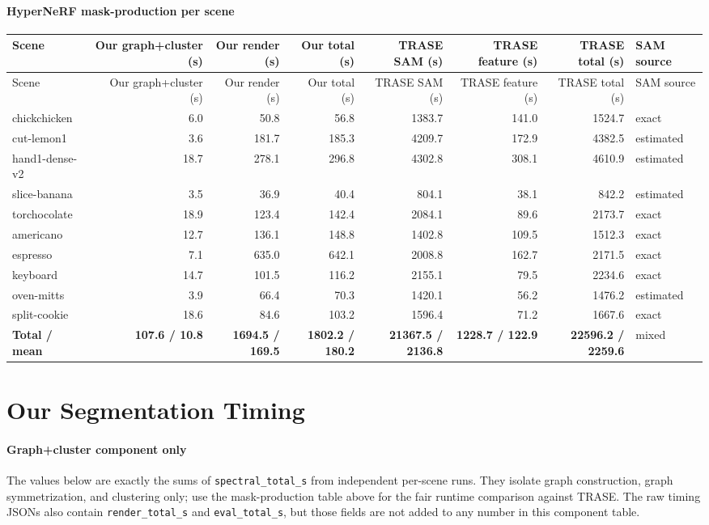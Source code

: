 \documentclass[10pt]{article}
\begin{document}
\paragraph{HyperNeRF mask-production per scene}
\small
\begin{longtable}{lrrrrrrl}
\toprule
Scene & Our graph+cluster (s) & Our render (s) & Our total (s) & TRASE SAM (s) & TRASE feature (s) & TRASE total (s) & SAM source \\
\midrule
\endfirsthead
\toprule
Scene & Our graph+cluster (s) & Our render (s) & Our total (s) & TRASE SAM (s) & TRASE feature (s) & TRASE total (s) & SAM source \\
\midrule
\endhead
chickchicken & 6.0 & 50.8 & 56.8 & 1383.7 & 141.0 & 1524.7 & exact \\
cut-lemon1 & 3.6 & 181.7 & 185.3 & 4209.7 & 172.9 & 4382.5 & estimated \\
hand1-dense-v2 & 18.7 & 278.1 & 296.8 & 4302.8 & 308.1 & 4610.9 & estimated \\
slice-banana & 3.5 & 36.9 & 40.4 & 804.1 & 38.1 & 842.2 & estimated \\
torchocolate & 18.9 & 123.4 & 142.4 & 2084.1 & 89.6 & 2173.7 & exact \\
americano & 12.7 & 136.1 & 148.8 & 1402.8 & 109.5 & 1512.3 & exact \\
espresso & 7.1 & 635.0 & 642.1 & 2008.8 & 162.7 & 2171.5 & exact \\
keyboard & 14.7 & 101.5 & 116.2 & 2155.1 & 79.5 & 2234.6 & exact \\
oven-mitts & 3.9 & 66.4 & 70.3 & 1420.1 & 56.2 & 1476.2 & estimated \\
split-cookie & 18.6 & 84.6 & 103.2 & 1596.4 & 71.2 & 1667.6 & exact \\
\midrule
\textbf{Total / mean} & \textbf{107.6 / 10.8} & \textbf{1694.5 / 169.5} & \textbf{1802.2 / 180.2} & \textbf{21367.5 / 2136.8} & \textbf{1228.7 / 122.9} & \textbf{22596.2 / 2259.6} & mixed \\
\bottomrule
\end{longtable}
\normalsize

\section{Our Segmentation Timing}
\paragraph{Graph+cluster component only}
The values below are exactly the sums of \texttt{spectral\_total\_s} from independent per-scene runs.  They isolate graph construction, graph symmetrization, and clustering only; use the mask-production table above for the fair runtime comparison against TRASE.  The raw timing JSONs also contain \texttt{render\_total\_s} and \texttt{eval\_total\_s}, but those fields are not added to any number in this component table.
\end{document}
